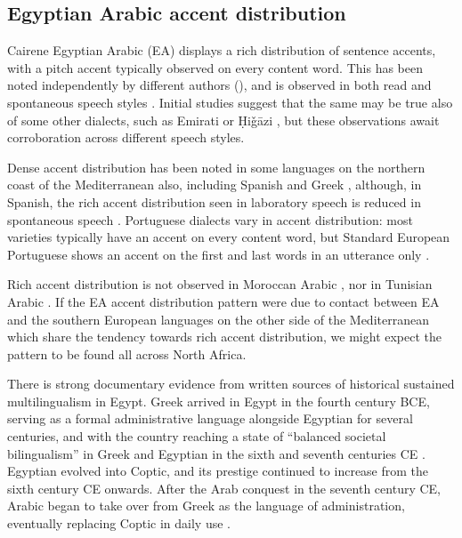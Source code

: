 \documentclass[output=paper]{langsci/langscibook}
\begin{document}
 
 \subsection{Egyptian Arabic accent distribution} \label{egypt}


Cairene Egyptian Arabic (EA) displays a rich distribution of sentence accents, with a pitch accent typically observed on every content word. This has been noted independently by different authors (\citealt{Rifaat1991,Rastegar-ElZarka1997}), and is observed in both read and spontaneous speech styles \citep{Hellmuth2006}. Initial studies suggest that the same may be true also of some other dialects, such as Emirati \citep{BlodgettOwensRockwood2007} or Ḥiǧāzi \citep{Alzaidi2014}, but these observations await corroboration across different speech styles. 

Dense accent distribution has been noted in some languages on the northern coast of the Mediterranean also, including Spanish and Greek  \citep{Jun2005}, although, in Spanish, the rich accent distribution seen in laboratory speech is reduced in spontaneous speech \citep{Face2003}. Portuguese dialects vary in accent distribution: most varieties typically have an accent on every content word, but Standard European Portuguese shows an accent on the first and last words in an utterance only \citep{FrotaEtAl2015}. 

Rich accent distribution is not observed in Moroccan Arabic \citep{Benkirane1998}, nor in Tunisian Arabic \citep{Hellmuthtoappearbook}. If the EA accent distribution pattern were due to contact between EA and the southern European languages on the other side of the Mediterranean which share the tendency towards rich accent distribution, we might expect the pattern to be found all across North Africa.

There is strong documentary evidence from written sources of historical sustained multilingualism in Egypt. Greek arrived in Egypt in the fourth century BCE, serving as a formal administrative language alongside Egyptian for several centuries, and with the country reaching a state of “balanced societal bilingualism” in Greek and Egyptian in the sixth and seventh centuries CE \citep[6]{Papaconstantinou2010}. Egyptian evolved into Coptic, and its prestige continued to increase from the sixth century CE onwards. After the Arab conquest in the seventh century CE, Arabic began to take over from Greek as the language of administration, eventually replacing Coptic in daily use \citep{Papaconstantinou2012}. 
\end{document}
